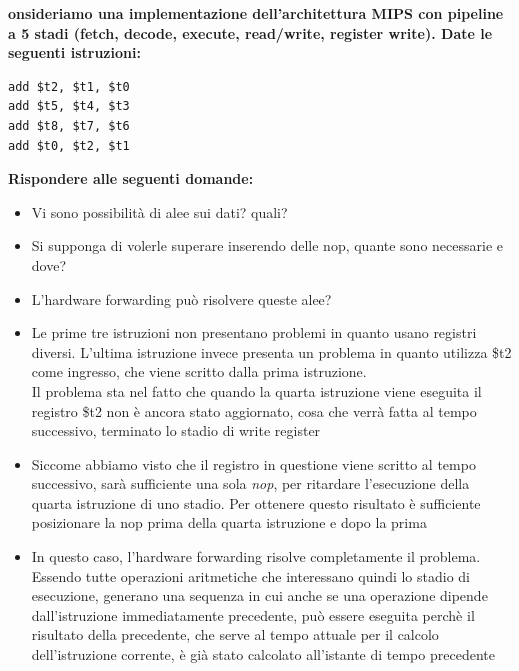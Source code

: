 \documentclass[a4paper,12pt, oneside]{book}
\begin{document}
\begin{esercizio}
  \textbf{onsideriamo una implementazione dell'architettura MIPS con pipeline a 5 stadi (fetch, decode, execute, read/write, register write).
    Date le seguenti istruzioni:}
\begin{verbatim}
add $t2, $t1, $t0
add $t5, $t4, $t3
add $t8, $t7, $t6
add $t0, $t2, $t1
\end{verbatim}
  \textbf{Rispondere alle seguenti domande:}
  \begin{itemize}
    \item Vi sono possibilità di alee sui dati? quali?
    \item Si supponga di volerle superare inserendo delle nop, quante sono necessarie e dove?
    \item L'hardware forwarding può risolvere queste alee?
  \end{itemize}
  \begin{itemize}
    \item Le prime tre istruzioni non presentano problemi in quanto
    usano registri diversi. L'ultima istruzione invece presenta un
    problema in quanto utilizza \$t2 come ingresso,  che viene scritto
    dalla prima istruzione.\\
    Il problema sta nel fatto che quando la quarta istruzione viene eseguita
    il registro \$t2 non è ancora stato aggiornato, cosa che verrà
    fatta al tempo successivo, terminato lo stadio di write register
    \item Siccome abbiamo visto che il registro in questione viene
    scritto al tempo successivo, sarà sufficiente una sola\textit{ nop},
    per ritardare l'esecuzione della quarta istruzione di uno stadio.
    Per ottenere questo risultato è sufficiente posizionare
    la nop prima della quarta istruzione e dopo la prima
    \item In questo caso, l'hardware forwarding risolve completamente
    il problema. Essendo tutte operazioni aritmetiche che interessano
    quindi lo stadio di esecuzione, generano una sequenza in cui anche
    se una operazione dipende dall'istruzione immediatamente
    precedente, può essere eseguita perchè il risultato della
    precedente, che serve al tempo attuale per il calcolo
    dell'istruzione corrente, è già stato calcolato all'istante
    di tempo precedente
  \end{itemize}
\end{esercizio}
\end{document}
